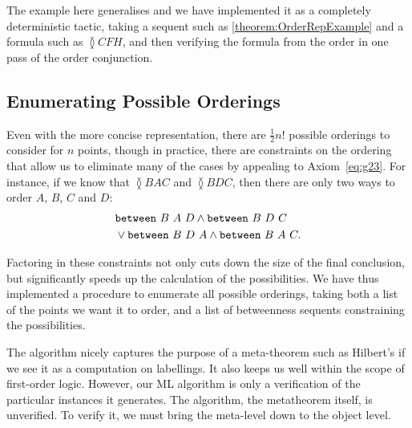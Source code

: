 The example here generalises and we have implemented it as a completely deterministic tactic, taking a sequent such as \eqref{theorem:OrderRepExample} and a formula such as $\between{C}{F}{H}$, and then verifying the formula from the order in one pass of the order conjunction.

\subsection{Enumerating Possible Orderings}
Even with the more concise representation, there are $\frac{1}{2}n!$ possible orderings to consider for $n$ points, though in practice, there are constraints on the ordering that allow us to eliminate many of the cases by appealing to Axiom~\ref{eq:g23}. For instance, if we know that $\between{B}{A}{C}$ and $\between{B}{D}{C}$, then there are only two ways to order $A$, $B$, $C$ and $D$:
\begin{align*}
&\texttt{between}\ B\ A\ D\wedge\texttt{between}\ B\ D\ C\\
&\vee\texttt{between}\ B\ D\ A\wedge\texttt{between}\ B\ A\ C.
\end{align*}

Factoring in these constraints not only cuts down the size of the final conclusion, but significantly speeds up the calculation of the possibilities. We have thus implemented a procedure to enumerate all possible orderings, taking both a list of the points we want it to order, and a list of betweenness sequents constraining the possibilities.

The algorithm nicely captures the purpose of a meta-theorem such as Hilbert's if we see it as a computation on labellings. It also keeps us well within the scope of first-order logic. However, our ML algorithm is only a verification of the particular instances it generates. The algorithm, the metatheorem itself, is unverified. To verify it, we must bring the meta-level down to the object level.

